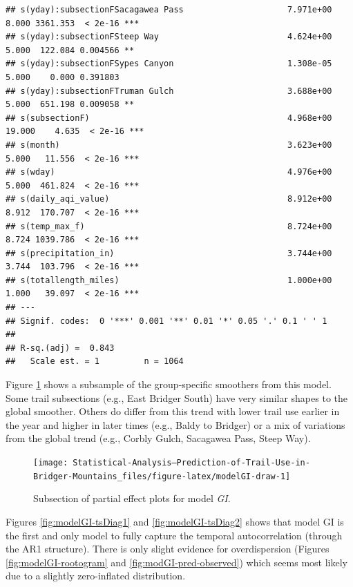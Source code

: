 \documentclass[
]{book}
\begin{document}
\begin{verbatim}
## s(yday):subsectionFSacagawea Pass                     7.971e+00  8.000 3361.353  < 2e-16 ***
## s(yday):subsectionFSteep Way                          4.624e+00  5.000  122.084 0.004566 ** 
## s(yday):subsectionFSypes Canyon                       1.308e-05  5.000    0.000 0.391803    
## s(yday):subsectionFTruman Gulch                       3.688e+00  5.000  651.198 0.009058 ** 
## s(subsectionF)                                        4.968e+00 19.000    4.635  < 2e-16 ***
## s(month)                                              3.623e+00  5.000   11.556  < 2e-16 ***
## s(wday)                                               4.976e+00  5.000  461.824  < 2e-16 ***
## s(daily_aqi_value)                                    8.912e+00  8.912  170.707  < 2e-16 ***
## s(temp_max_f)                                         8.724e+00  8.724 1039.786  < 2e-16 ***
## s(precipitation_in)                                   3.744e+00  3.744  103.796  < 2e-16 ***
## s(totallength_miles)                                  1.000e+00  1.000   39.097  < 2e-16 ***
## ---
## Signif. codes:  0 '***' 0.001 '**' 0.01 '*' 0.05 '.' 0.1 ' ' 1
## 
## R-sq.(adj) =  0.843   
##   Scale est. = 1         n = 1064
\end{verbatim}

Figure \ref{fig:modelGI-draw} shows a subsample of the group-specific smoothers from this model. Some trail subsections (e.g., East Bridger South) have very similar shapes to the global smoother. Others do differ from this trend with lower trail use earlier in the year and higher in later times (e.g., Baldy to Bridger) or a mix of variations from the global trend (e.g., Corbly Gulch, Sacagawea Pass, Steep Way).

\begin{figure}

{\centering \texttt{[image: Statistical-Analysis--Prediction-of-Trail-Use-in-Bridger-Mountains\_files/figure-latex/modelGI-draw-1]} 

}

\caption{Subsection of partial effect plots for model \emph{GI}.}\label{fig:modelGI-draw}
\end{figure}

Figures \ref{fig:modelGI-tsDiag1} and \ref{fig:modelGI-tsDiag2} shows that model GI is the first and only model to fully capture the temporal autocorrelation (through the AR1 structure). There is only slight evidence for overdispersion (Figures \ref{fig:modelGI-rootogram} and \ref{fig:modGI-pred-observed}) which seems most likely due to a slightly zero-inflated distribution.
\end{document}
